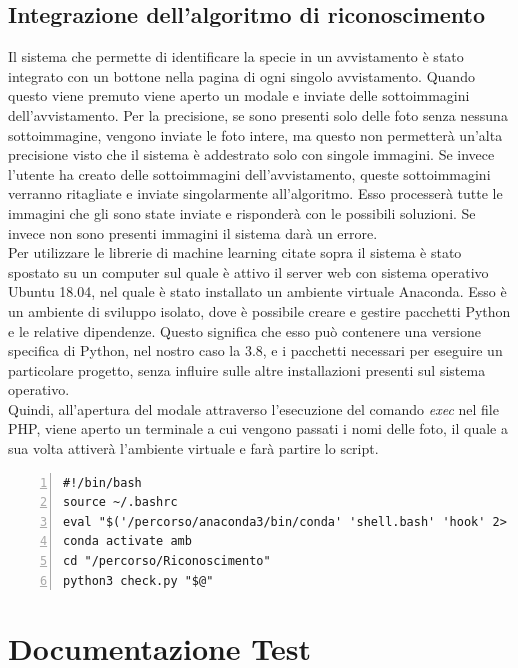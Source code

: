 \documentclass[a4paper,final,12pt]{report}
\begin{document}
\section{Integrazione dell'algoritmo di riconoscimento}
Il sistema che permette di identificare la specie in un avvistamento è stato integrato con un bottone nella pagina di ogni singolo avvistamento. Quando questo viene premuto viene aperto un modale e inviate delle sottoimmagini dell'avvistamento. Per la precisione, se sono presenti solo delle foto senza nessuna sottoimmagine, vengono inviate le foto intere, ma questo non permetterà un'alta precisione visto che il sistema è addestrato solo con singole immagini. Se invece l'utente ha creato delle sottoimmagini dell'avvistamento, queste sottoimmagini verranno ritagliate e inviate singolarmente all'algoritmo. Esso processerà tutte le immagini che gli sono state inviate e risponderà con le possibili soluzioni. Se invece non sono presenti immagini il sistema darà un errore.\\
Per utilizzare le librerie di machine learning citate sopra il sistema è stato spostato su un computer sul quale è attivo il server web con sistema operativo Ubuntu 18.04, nel quale è stato installato un ambiente virtuale Anaconda. Esso è un ambiente di sviluppo isolato, dove è possibile creare e gestire pacchetti Python e le relative dipendenze. Questo significa che esso può contenere una versione specifica di Python, nel nostro caso la 3.8, e i pacchetti necessari per eseguire un particolare progetto, senza influire sulle altre installazioni presenti sul sistema operativo.\\
Quindi, all'apertura del modale attraverso l'esecuzione del comando \textit{exec} nel file PHP, viene aperto un terminale a cui vengono passati i nomi delle foto, il quale a sua volta attiverà l'ambiente virtuale e farà partire lo script.
\begin{lstlisting}[caption={Codice script bash.}, label={lst:script_bash}, breaklines, escapechar=`\%, frame=lines, basicstyle=\small\ttfamily, keepspaces=true, numbers=left]
#!/bin/bash
source ~/.bashrc
eval "$('/percorso/anaconda3/bin/conda' 'shell.bash' 'hook' 2> /dev/null)"
conda activate amb
cd "/percorso/Riconoscimento"
python3 check.py "$@"
\end{lstlisting}

\chapter{Documentazione Test}
\end{document}
